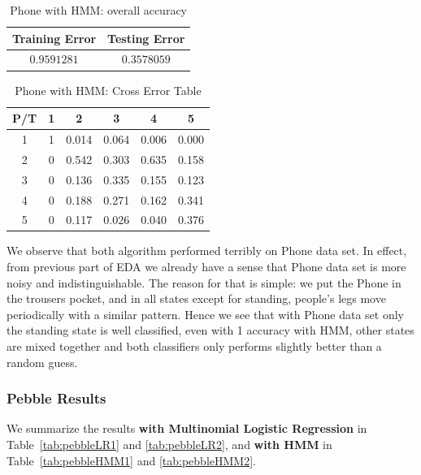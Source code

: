 \begin{table}[!htb]
\begin{center}
\begin{tabular}{c|c}
      \hline
      Training Error & Testing Error\\
      \hline
      $0.9591281$ & $0.3578059$ \\
      \hline
\end{tabular}
\caption{Phone with HMM: overall accuracy}
\label{tab:phoneHMM1}
\end{center}
\end{table}
\begin{table}[!htb]
\begin{center}
\begin{tabular}{c|c|c|c|c|c}
      \hline
      P/T& 1 & 2 &3 & 4 & 5 \\
      \hline
      1 &1&0.014&0.064&0.006&0.000\\
      2 &0&0.542&0.303&0.635&0.158\\
      3 &0&0.136&0.335&0.155&0.123\\
      4 &0&0.188&0.271&0.162&0.341\\
      5 & 0&0.117&0.026&0.040&0.376\\
      \hline
\end{tabular}
\caption{Phone with HMM: Cross Error Table}
\label{tab:phoneHMM2}
\end{center}
\end{table}

We observe that both algorithm performed terribly on Phone data set. In effect, from previous part of EDA we already have a sense that Phone data set is more noisy and indistinguishable. The reason for that is simple: we put the Phone in the trousers pocket, and in all states except for standing, people's legs move periodically with a similar pattern. Hence we see that with Phone data set only the standing state is well classified, even with 1 accuracy with HMM, other states are mixed together and both classifiers only performs slightly better than a random guess. 

\subsubsection{Pebble Results}
\label{subsec:pebbleresult}

We summarize the results \textbf{with Multinomial Logistic Regression} in Table~\ref{tab:pebbleLR1} and \ref{tab:pebbleLR2}, and \textbf{with HMM} in Table~\ref{tab:pebbleHMM1} and \ref{tab:pebbleHMM2}.

